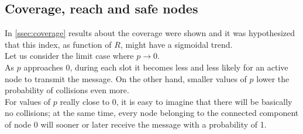 \subsection{Coverage, reach and safe nodes}\label{ssec:coverageReachSafenodes}
In \ref{ssec:coverage} results about the coverage were shown and it was
hypothesized that this index, as function of $R$, might have a sigmoidal trend.\\
Let us consider the limit case where $p \to 0$.\\
As $p$ approaches 0, during each slot it becomes less and less likely for an
active node to transmit the message. On the other hand, smaller values of $p$
lower the probability of collisions even more.\\
For values of $p$ really close to 0, it is easy to imagine that there will be
basically no collisions; at the same time, every node belonging to the connected
component of node 0 will sooner or later receive the message with a probability
of 1.\\
